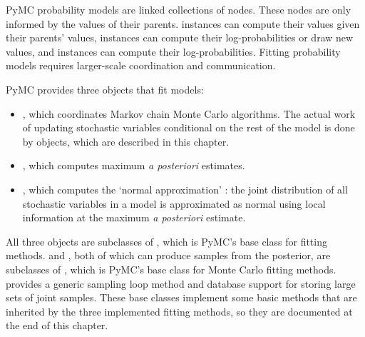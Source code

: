 PyMC probability models are linked collections of nodes. These nodes are only informed by the values of their parents.  instances can compute their values given their parents' values,  instances can compute their log-probabilities or draw new values, and  instances can compute their log-probabilities. Fitting probability models requires larger-scale coordination and communication. 

PyMC provides three objects that fit models:
\begin{itemize}
    \item {}, which coordinates Markov chain Monte Carlo algorithms. The actual work of updating stochastic variables conditional on the rest of the model is done by  objects, which are described in this chapter.
    \item {}, which computes maximum \emph{a posteriori} estimates.
    \item {}, which computes the `normal approximation' \citep{gelman}: the joint distribution of all stochastic variables in a model is approximated as normal using local information at the maximum \emph{a posteriori} estimate.
\end{itemize}

All three objects are subclasses of , which is PyMC's base class for fitting methods.  and , both of which can produce samples from the posterior, are subclasses of , which is PyMC's base class for Monte Carlo fitting methods.  provides a generic sampling loop method and database support for storing large sets of joint samples. These base classes implement some basic methods that are inherited by the three implemented fitting methods, so they are documented at the end of this chapter. %


